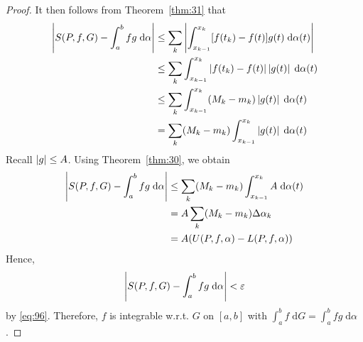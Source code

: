 \documentclass[thmcnt=section, 12pt]{my-elegantbook}
\begin{document}
\begin{proof}
    It then follows from Theorem~\ref{thm:31} that 
    \begin{align*}
        \left\lvert S(P,f, G) - \int_{a}^{b} f g  \; \mathrm{d}\alpha \right\rvert
        &\leq \sum_k \left\lvert 
                \int_{x_{k-1}}^{x_k} [f(t_k) - f(t)] g(t) \; \mathrm{d}\alpha(t)
             \right\rvert \\
        &\leq \sum_k \int_{x_{k-1}}^{x_k} \left\lvert f(t_k) - f(t) \right\rvert \left\lvert g(t) \right\rvert \; \mathrm{d}\alpha(t) \\
        &\leq \sum_k \int_{x_{k-1}}^{x_k} (M_k - m_k) \left\lvert g(t) \right\rvert \; \mathrm{d}\alpha(t) \\
        &= \sum_k (M_k - m_k) \int_{x_{k-1}}^{x_k} \left\lvert g(t) \right\rvert \; \mathrm{d}\alpha(t)
    \end{align*}
    Recall $\left\lvert g \right\rvert \leq A$. Using Theorem~\ref{thm:30}, we obtain
    \begin{align*}
        \left\lvert S(P,f, G) - \int_{a}^{b} f g  \; \mathrm{d}\alpha \right\rvert
        &\leq \sum_k (M_k - m_k) \int_{x_{k-1}}^{x_k} A \; \mathrm{d}\alpha(t) \\
        &= A \sum_k (M_k - m_k) \Delta\alpha_k \\ 
        &= A (U(P,f,\alpha) - L(P,f,\alpha))
    \end{align*}
    Hence, 
    \begin{align*}
        \left\lvert S(P,f,G) - \int_{a}^{b} f g  \; \mathrm{d}\alpha \right\rvert < \varepsilon
    \end{align*}
    by \eqref{eq:96}. Therefore, $f$ is integrable w.r.t. $G$ on $[a, b]$ with $\int_{a}^{b} f \; \mathrm{d}G = \int_{a}^{b} f g  \; \mathrm{d}\alpha$.
\end{proof}
\end{document}
